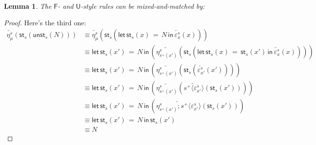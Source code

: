 \documentclass[10pt]{article}
\newtheorem{lemma}{Lemma}
\theoremstyle{definition}
\newcommand{\rewrite}[2]{\overleftarrow{#1}(#2)}
\newcommand\StI[2]{\ensuremath{\mathsf{st}_{#1}(#2)}}
\newcommand\UStI[2]{\ensuremath{\mathsf{ust}_{#1}(#2)}}
\newcommand\UnSt[2]{\ensuremath{\mathsf{unst}_{#1}(#2)}}
\newcommand\StE[4]{\ensuremath{\mathsf{let} \, \StI{#1}{#3} \, = \, {#2} \, \mathsf{in} \, #4}}
\newcommand\TrPlus[2]{\ensuremath{{#1}^+(#2)}}
\newcommand\ap[2]{\ensuremath{#1 \langle #2 \rangle }}
\begin{document}
\begin{lemma}
The $\mathsf{F}$- and $\mathsf{U}$-style rules can be mixed-and-matched by:
\end{lemma}
\begin{proof}

Here's the third one:
\begin{align*}
\rewrite{\eta^s_{\mu}}{\StI{s}{\UnSt{s}{N}}} 
&\equiv \rewrite{\eta^s_{\mu}}{\StI{s}{\StE{s}{N}{x}{\rewrite{\varepsilon^s_x}{x}}}} \\
&\equiv \StE{s}{N}{x'}{(\rewrite{\eta^s_{\TrPlus{s}{x'}}}{\StI{s}{\StE{s}{\StI{s}{x'}}{x}{\rewrite{\varepsilon^s_x}{x}}}})} \\
&\equiv \StE{s}{N}{x'}{(\rewrite{\eta^s_{\TrPlus{s}{x'}}}{\StI{s}{\rewrite{\varepsilon^s_{x'}}{x'}}})} \\
&\equiv \StE{s}{N}{x'}{(\rewrite{\eta^s_{\TrPlus{s}{x'}}}{\rewrite{\ap{s^+}{\varepsilon^s_{x'}}}{\StI{s}{x'}}})} \\
&\equiv \StE{s}{N}{x'}{(\rewrite{\eta^s_{\TrPlus{s}{x'}};\ap{s^+}{\varepsilon^s_{x'}}}{\StI{s}{x'}})} \\
&\equiv \StE{s}{N}{x'}{\StI{s}{x'}} \\
&\equiv N
\end{align*}
\end{proof}
\end{document}
